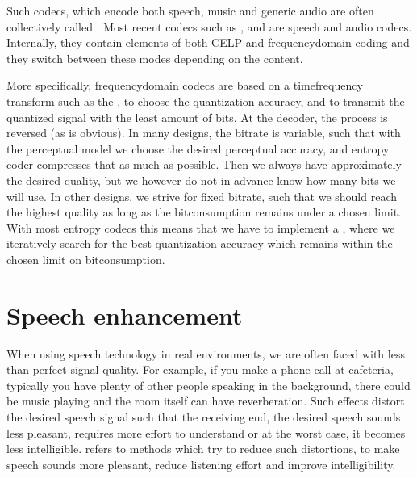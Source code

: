 \documentclass[letterpaper,10pt,english]{jupyterBook}
\begin{document}
\sphinxAtStartPar
Such codecs, which encode both speech, music and generic audio are often
collectively called . Most recent codecs such
as ,
 and
 are speech
and audio codecs. Internally, they contain elements of both CELP and
frequency\sphinxhyphen{}domain coding and they switch between these modes depending on
the content.

\sphinxAtStartPar
More specifically, frequency\sphinxhyphen{}domain codecs are based on a time\sphinxhyphen{}frequency
transform such as the ,
{\hyperref[\detokenize{Transmission/Perceptual_modelling_in_speech_and_audio_coding::doc}]{}}
to choose the quantization accuracy, and {\hyperref[\detokenize{Transmission/Entropy_coding::doc}]{}} to transmit the quantized signal with the least
amount of bits. At the decoder, the process is reversed (as is obvious).
In many designs, the bitrate is variable, such that with the perceptual
model we choose the desired perceptual accuracy, and entropy coder
compresses that as much as possible. Then we always have approximately
the desired quality, but we however do not in advance know how many bits
we will use. In other designs, we strive for fixed bitrate, such that we
should reach the highest quality as long as the bit\sphinxhyphen{}consumption remains
under a chosen limit. With most entropy codecs this means that we have
to implement a , where we iteratively search for the best
quantization accuracy which remains within the chosen limit on
bit\sphinxhyphen{}consumption.

\sphinxAtStartPar
{}

\sphinxstepscope


\chapter{Speech enhancement}
\label{\detokenize{Speech_enhancement:speech-enhancement}}\label{\detokenize{Speech_enhancement::doc}}
\sphinxAtStartPar
When using speech technology in real environments, we are often faced
with less than perfect signal quality. For example, if you make a phone
call at cafeteria, typically you have plenty of other people speaking in
the background, there could be music playing and the room itself can
have reverberation. Such effects distort the desired speech signal such
that the receiving end, the desired speech sounds less pleasant,
requires more effort to understand or at the worst case, it becomes less
intelligible.  refers to methods which try to reduce
such distortions, to make speech sounds more pleasant, reduce listening
effort and improve intelligibility.
\end{document}
